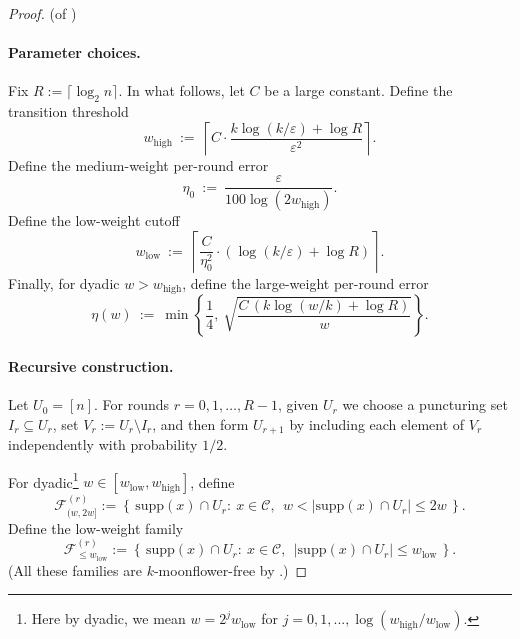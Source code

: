 \documentclass{article}
\DeclareMathOperator{\high}{\mathrm{high}}
\DeclareMathOperator{\low}{\mathrm{low}}
\newcommand{\<}{\langle}
\renewcommand{\>}{\rangle}
\newcommand{\calC}{\mathcal{C}}
\newcommand{\calF}{\mathcal{F}}
\newcommand{\supp}{\mathrm{supp}}
\newcommand{\shachar}[1]{\textcolor{blue}{(Shachar: {#1})}}
\newcommand{\yimeng}[1]{\textcolor{orange}{(Yimeng: {#1})}}
\newcommand{\ignore}[1]{{}}
\begin{document}
\begin{proof}(of )

\paragraph{Parameter choices.}
Fix $R:=\lceil \log_2 n\rceil$. In what follows, let $C$ be a large constant. Define the transition threshold \ignore{\shachar{we have 3 unspecified constants $C$ below, do we assume they are all the same? if not then lets call them $C_1,C_2,C_3$; this then needs to be propagated into the proof} \yimeng{I think we can assume they are the same. As long as it's large enough, the proof should go through.}\shachar{at least it should be clear if $C$ should be large enough or small enough. EG if we incrase $C$ does it keep everything consistent?}}
\[
w_{\mathrm{high}}\ :=\ \left\lceil
C\cdot \frac{k\log(k/\varepsilon)+\log R}{\varepsilon^2}
\right\rceil.
\]
Define the medium-weight per-round error
\[
\eta_0\ :=\ \frac{\varepsilon}{100\log(2w_{\mathrm{high}})}.
\]
Define the low-weight cutoff
\[
w_{\mathrm{low}}\ :=\ \left\lceil \frac{C}{\eta_0^2}\cdot\left(\log(k/\varepsilon)+\log R\right)\right\rceil.
\]
Finally, for dyadic $w>w_{\mathrm{high}}$, define the large-weight per-round error
\[
\eta(w)\ :=\ \min\left\{\frac14,\ \sqrt{\frac{C\,(k\log( w/k)+\log R)}{w}}\right\}.
\]

\paragraph{Recursive construction.}
Let $U_0=[n]$. For rounds $r=0,1,\dots,R-1$, given $U_r$ we choose a puncturing set $I_r\subseteq U_r$,
set $V_r:=U_r\setminus I_r$, and then form $U_{r+1}$ by including each element of $V_r$
independently with probability $1/2$.

For dyadic\footnote{Here by dyadic, we mean $w = 2^j w_{\low}$ for $j = 0,1,...,\log (w_{\high} / w_{\low})$.} $w\in[w_{\low},w_{\high}]$, define
\[
\calF^{(r)}_{(w,2w]}
:=
\left\{\,\supp(x)\cap U_r:\ x\in\calC,\ \ w<|\supp(x)\cap U_r|\le 2w\,\right\}.
\]
Define the low-weight family
\[
\calF^{(r)}_{\le w_{\low}}
:=
\left\{\,\supp(x)\cap U_r:\ x\in\calC,\ \ |\supp(x)\cap U_r|\le w_{\low}\,\right\}.
\]
(All these families are $k$-moonflower-free by .)


\end{proof}
\end{document}
